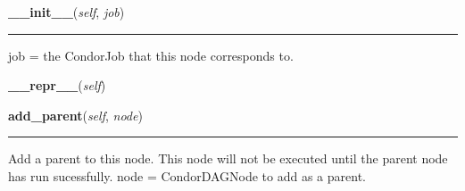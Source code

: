     \label{pipeline:CondorDAGNode:__init__}
    \vspace{0.5ex}

    \noindent\begin{boxedminipage}{\textwidth}

    \raggedright \textbf{\_\_init\_\_}(\textit{self}, \textit{job})

    \vspace{-1.5ex}

    \rule{\textwidth}{0.5\fboxrule}
    job = the CondorJob that this node corresponds to.

    \vspace{1ex}

    \end{boxedminipage}

    \label{pipeline:CondorDAGNode:__repr__}
    \vspace{0.5ex}

    \noindent\begin{boxedminipage}{\textwidth}

    \raggedright \textbf{\_\_repr\_\_}(\textit{self})

    \end{boxedminipage}

    \label{pipeline:CondorDAGNode:add_parent}
    \vspace{0.5ex}

    \noindent\begin{boxedminipage}{\textwidth}

    \raggedright \textbf{add\_parent}(\textit{self}, \textit{node})

    \vspace{-1.5ex}

    \rule{\textwidth}{0.5\fboxrule}
    Add a parent to this node. This node will not be executed until the 
    parent node has run sucessfully. node = CondorDAGNode to add as a 
    parent.

    \vspace{1ex}

    \end{boxedminipage}

    \label{pipeline:CondorDAGNode:add_var}
    \vspace{0.5ex}

